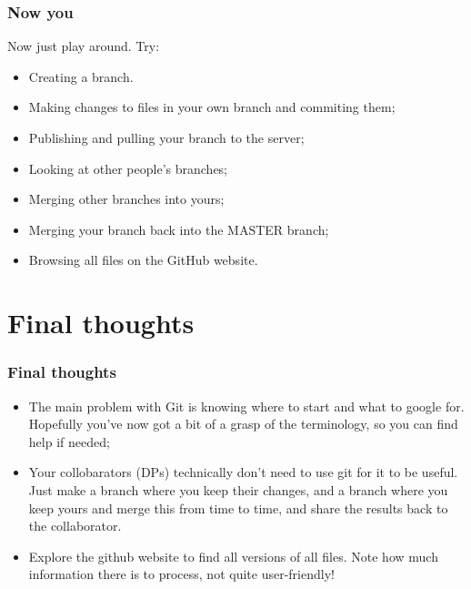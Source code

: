 \documentclass{beamer}
\begin{document}
\begin{frame}
	\frametitle{Now you}
	Now just play around. Try:
	\begin{itemize}
		\item Creating a branch.
		\item Making changes to files in your own branch and commiting them;
		\item Publishing and pulling your branch to the server;
		\item Looking at other people's branches;
		\item Merging other branches into yours;
		\item Merging your branch back into the MASTER branch;
		\item Browsing all files on the GitHub website.
	\end{itemize}
\end{frame}

\section{Final thoughts}

\begin{frame}
	\frametitle{Final thoughts}
	\begin{itemize}
		\item The main problem with Git is knowing where to start and what to google for. Hopefully you've now got a bit of a grasp of the terminology, so you can find help if needed;
		\item Your collobarators (DPs) technically don't need to use git for it to be useful. Just make a branch where you keep their changes, and a branch where you keep yours and merge this from time to time, and share the results back to the collaborator.
		\item Explore the github website to find all versions of all files. Note how much information there is to process, not quite user-friendly!
	\end{itemize}
\end{frame}




\end{document}
